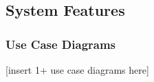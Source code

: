 \documentclass[twoside,letterpaper]{article}
\begin{document}
\clearpage %
\subsection{System Features}

\subsubsection{Use Case Diagrams}
[insert 1+ use case diagrams here]

\clearpage
\end{document}
